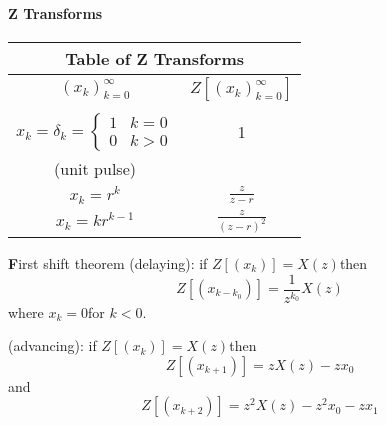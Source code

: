 
\paragraph{Z Transforms}
\begin{center}
\large
\begin{tabular}{|c|c|}
\hline
\multicolumn{2}{|c|}{\textbf Table of Z Transforms}\\
\hline
$(x_k)_{k=0}^\infty$&  $Z \left[(x_k)_{k=0}^\infty \right]$\\
\hline
&\\
$x_k =\delta_k= \left\{ \begin{array}{ll} 1 & k = 0\\
   				 0 & k > 0
		\end{array} \right.$             & 1\\
(unit pulse)                 & \\
$x_k = r^k$ & $\frac{z}{z-r}$\\

$x_k = kr^{k-1}$ & $\frac{z}{(z-r)^2}$\\

\hline
\end{tabular}
\end{center}
{\textbf First shift theorem} (delaying):  if ${{Z}}[(x_k)]=X(z)$then
\[
{{Z}}[(x_{k-k_0})]=\frac{1}{z^{k_0}}X(z)
\]
where $x_k=0$for $k<0$.

 (advancing): if ${Z}[(x_k)]=X(z)$then
\[
{Z}[(x_{k+1})]=zX(z)-zx_0
\]
and
\[
{Z}[(x_{k+2})]=z^2X(z)-z^2x_0-zx_1
\]



